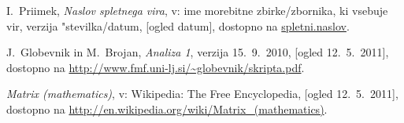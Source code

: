 \documentclass[12pt,a4paper]{amsart}
\theoremstyle{definition} %
\theoremstyle{plain} %
\begin{document}
\begin{thebibliography}{99}
I.~Priimek, \emph{Naslov spletnega vira}, v: ime morebitne zbirke/zbornika, ki vsebuje vir, verzija "stevilka/datum, [ogled datum], dostopno na \url{spletni.naslov}.

J.~Globevnik in M.~Brojan, \emph{Analiza 1}, verzija 15.~9.~2010, [ogled 12.~5.~2011], dostopno na \url{http://www.fmf.uni-lj.si/~globevnik/skripta.pdf}.

\emph{Matrix (mathematics)}, v: Wikipedia: The Free Encyclopedia, [ogled 12.~5.~2011], dostopno na \url{http://en.wikipedia.org/wiki/Matrix_(mathematics)}.




\end{thebibliography}
\end{document}
